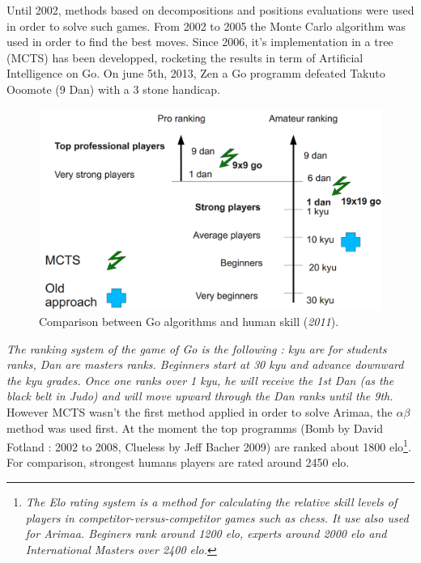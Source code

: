 
Until 2002, methods based on decompositions and positions evaluations were used in order to solve such games. From 2002 to 2005 the Monte Carlo algorithm was used in order to find the best moves. Since 2006, it's implementation in a tree (MCTS) has been developped, rocketing the results in term of Artificial Intelligence on Go. On june 5th, 2013, Zen a Go programm defeated Takuto Ooomote (9 Dan) with a 3 stone handicap.\cite{computer_Go_vs_human}
\begin{figure}[H]
\centering
\includegraphics[width=12cm]{2_State_of_the_art/Arimaa_on_MCTS_Benoit/img/ranking.png}
\caption{\label{fig:ranking}Comparison between Go algorithms and human skill (\textit{2011})\cite{graphic_MCTS_Go}.}
\end{figure}
\textit{The ranking system of the game of Go is the following : kyu are for students ranks, Dan are masters ranks. Beginners start at 30 kyu and advance downward the kyu grades. Once one ranks over 1 kyu, he will receive the 1st Dan (as the black belt in Judo) and will move upward through the Dan ranks until the 9th.}\\
However MCTS wasn't the first method applied in order to solve Arimaa, the \ensuremath{\alpha\beta} method was used first. At the moment the top programms (Bomb by David Fotland : 2002 to 2008, Clueless by Jeff Bacher 2009) are ranked about 1800 elo\footnote{\textit{The Elo rating system is a method for calculating the relative skill levels of players in competitor-versus-competitor games such as chess. It use also used for Arimaa. Beginers rank around 1200 elo, experts around 2000 elo and International Masters over 2400 elo.}}. For comparison, strongest humans players are rated around 2450 elo.\cite{master_mcts_kozeleck}
\medskip
